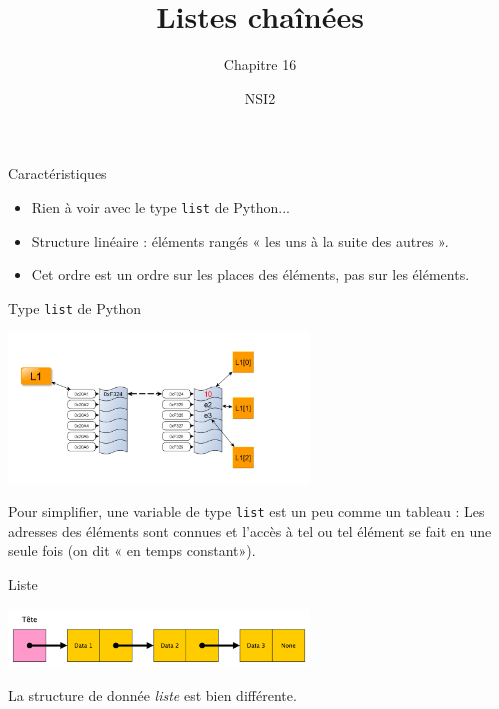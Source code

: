 \documentclass[10pt]{beamer}
\title{Listes chaînées}
\subtitle{Chapitre 16}
\author{NSI2}
\begin{document}
\maketitle

\begin{frame}{Caractéristiques}
	\begin{itemize}
		\item \alert{Rien à voir avec le type \texttt{list} de Python...}
		\item Structure linéaire : éléments rangés « les uns à la suite des autres ».
		\item Cet ordre est un ordre \alert{sur les places} des éléments, pas sur les éléments.
	\end{itemize}
\end{frame}
\begin{frame}{Type \texttt{list} de Python}
    \begin{center}
        \includegraphics[width=8cm]{img/Liste}
    \end{center}
    Pour simplifier, une variable de type \texttt{list} est un peu comme un \alert{tableau} : Les adresses des éléments sont connues et l'accès à tel ou tel élément se fait en une seule fois (on dit « en temps constant»).
\end{frame}
\begin{frame}{Liste}
    \begin{center}
    \includegraphics[width=8cm]{img/liste_chainee1}
\end{center}
La structure de donnée \textit{liste} est bien différente.
\end{frame}
\end{document}
